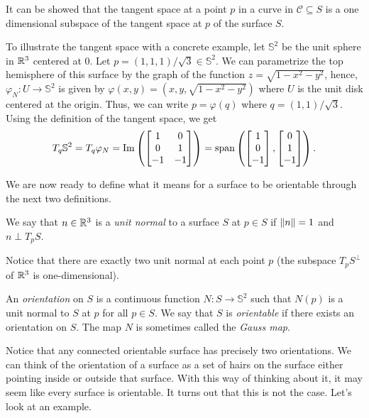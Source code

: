It can be showed that the tangent space at a point $p$ in a curve in $\mathcal{C} \subseteq S$ is a one dimensional subspace of the tangent space at $p$ of the surface $S$.

To illustrate the tangent space with a concrete example, let $\mathbb{S}^2$ be the unit sphere in $\R^3$ centered at 0. Let $p = (1,1,1)/\sqrt{3} \in \mathbb{S}^2$. We can parametrize the top hemisphere of this surface by the graph of the function $z = \sqrt{1 - x^2 - y^2}$, hence, $\varphi_N : U \to \mathbb{S}^2$ is given by $\varphi(x,y) = (x,y, \sqrt{1 - x^2 - y^2})$ where $U$ is the unit disk centered at the origin. Thus, we can write $p = \varphi(q)$ where $q = (1,1)/\sqrt{3}$. Using the definition of the tangent space, we get
$$T_q \S^2 = T_q \varphi_N = \Im\left( \begin{bmatrix}
    1 & 0 \\ 0 & 1 \\ -1 & -1
\end{bmatrix}\right) = \text{span}\left(\begin{bmatrix} 1 \\ 0 \\ - 1\end{bmatrix}, \begin{bmatrix} 0 \\ 1 \\ - 1\end{bmatrix}\right).$$

We are now ready to define what it means for a surface to be orientable through the next two definitions.

\begin{definition}
    We say that $n \in \R^3$ is a \textit{unit normal} to a surface $S$ at $p \in S$ if $\norm{n} = 1$ and $n \perp T_p S$.
\end{definition}

Notice that there are exactly two unit normal at each point $p$ (the subspace $T_p S^{\perp}$ of $\R^3$ is one-dimensional).

\begin{definition}
    An \textit{orientation} on $S$ is a continuous function $N : S \to \mathbb{S}^2$ such that $N(p)$ is a unit normal to $S$ at $p$ for all $p \in S$. We say that $S$ is \textit{orientable} if there exists an orientation on $S$. The map $N$ is sometimes called the \textit{Gauss map}.
\end{definition}

Notice that any connected orientable surface has precisely two orientations. We can think of the orientation of a surface as a set of hairs on the surface either pointing inside or outside that surface. With this way of thinking about it, it may seem like every surface is orientable. It turns out that this is not the case. Let's look at an example.

